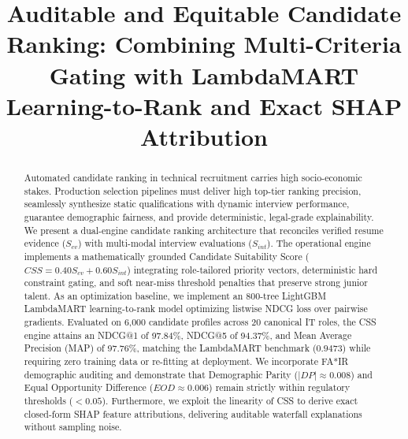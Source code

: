 \documentclass[conference]{IEEEtran}
\begin{document}
\title{Auditable and Equitable Candidate Ranking: Combining Multi-Criteria Gating with LambdaMART Learning-to-Rank and Exact SHAP Attribution}

\author{
}

\maketitle

\begin{abstract}
Automated candidate ranking in technical recruitment carries high socio-economic stakes. Production selection pipelines must deliver high top-tier ranking precision, seamlessly synthesize static qualifications with dynamic interview performance, guarantee demographic fairness, and provide deterministic, legal-grade explainability. We present a dual-engine candidate ranking architecture that reconciles verified resume evidence ($S_{cv}$) with multi-modal interview evaluations ($S_{int}$). The operational engine implements a mathematically grounded Candidate Suitability Score ($CSS = 0.40S_{cv} + 0.60S_{int}$) integrating role-tailored priority vectors, deterministic hard constraint gating, and soft near-miss threshold penalties that preserve strong junior talent. As an optimization baseline, we implement an 800-tree LightGBM LambdaMART learning-to-rank model optimizing listwise NDCG loss over pairwise gradients. Evaluated on 6,000 candidate profiles across 20 canonical IT roles, the CSS engine attains an NDCG@1 of 97.84\%, NDCG@5 of 94.37\%, and Mean Average Precision (MAP) of 97.76\%, matching the LambdaMART benchmark ($0.9473$) while requiring zero training data or re-fitting at deployment. We incorporate FA*IR demographic auditing and demonstrate that Demographic Parity ($|DP| \approx 0.008$) and Equal Opportunity Difference ($EOD \approx 0.006$) remain strictly within regulatory thresholds ($< 0.05$). Furthermore, we exploit the linearity of CSS to derive exact closed-form SHAP feature attributions, delivering auditable waterfall explanations without sampling noise.
\end{abstract}
\end{document}
